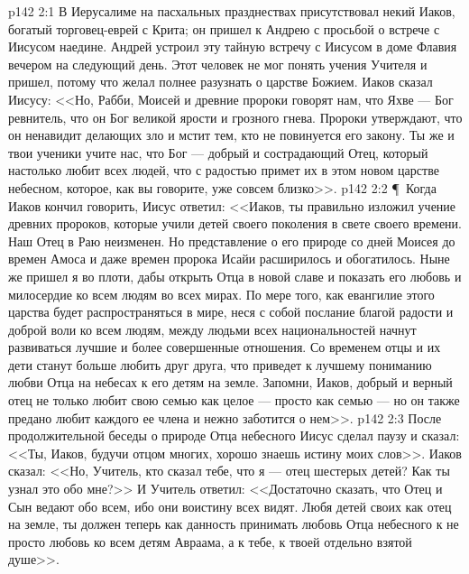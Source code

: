 \vs p142 2:1 В Иерусалиме на пасхальных празднествах присутствовал некий Иаков, богатый торговец\hyp{}еврей с Крита; он пришел к Андрею с просьбой о встрече с Иисусом наедине. Андрей устроил эту тайную встречу с Иисусом в доме Флавия вечером на следующий день. Этот человек не мог понять учения Учителя и пришел, потому что желал полнее разузнать о царстве Божием. Иаков сказал Иисусу: <<Но, Рабби, Моисей и древние пророки говорят нам, что Яхве --- Бог ревнитель, что он Бог великой ярости и грозного гнева. Пророки утверждают, что он ненавидит делающих зло и мстит тем, кто не повинуется его закону. Ты же и твои ученики учите нас, что Бог --- добрый и сострадающий Отец, который настолько любит всех людей, что с радостью примет их в этом новом царстве небесном, которое, как вы говорите, уже совсем близко>>.
\vs p142 2:2 \P\ Когда Иаков кончил говорить, Иисус ответил: <<Иаков, ты правильно изложил учение древних пророков, которые учили детей своего поколения в свете своего времени. Наш Отец в Раю неизменен. Но представление о его природе со дней Моисея до времен Амоса и даже времен пророка Исайи расширилось и обогатилось. Ныне же пришел я во плоти, дабы открыть Отца в новой славе и показать его любовь и милосердие ко всем людям во всех мирах. По мере того, как евангилие этого царства будет распространяться в мире, неся с собой послание благой радости и доброй воли ко всем людям, между людьми всех национальностей начнут развиваться лучшие и более совершенные отношения. Со временем отцы и их дети станут больше любить друг друга, что приведет к лучшему пониманию любви Отца на небесах к его детям на земле. Запомни, Иаков, добрый и верный отец не только любит свою семью как целое --- просто как семью --- но он также предано любит каждого ее  члена и нежно заботится о нем>>.
\vs p142 2:3 После продолжительной беседы о природе Отца небесного Иисус сделал паузу и сказал: <<Ты, Иаков, будучи отцом многих, хорошо знаешь истину моих слов>>. Иаков сказал: <<Но, Учитель, кто сказал тебе, что я --- отец шестерых детей? Как ты узнал это обо мне?>> И Учитель ответил: <<Достаточно сказать, что Отец и Сын ведают обо всем, ибо они воистину всех видят. Любя детей своих как отец на земле, ты должен теперь как данность принимать любовь Отца небесного к  не просто любовь ко всем детям Авраама, а к тебе, к твоей отдельно взятой душе>>.
